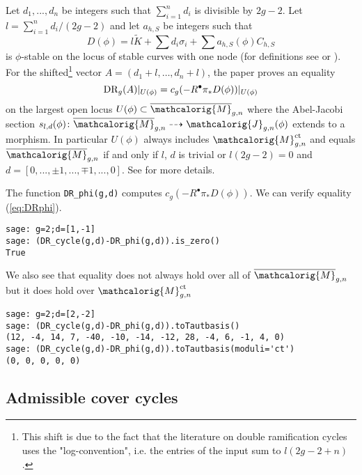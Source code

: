 \documentclass[11pt]{article}
\newcommand{\M}{\ensuremath{\overline{\mathcalorig{M}}}}
\begin{document}
Let $d_1,...,d_n$ be integers such that $\sum_{i=1}^n d_i$ is divisible by $2g-2$. Let $l=\sum_{i=1}^n d_i /(2g-2)$ and let $a_{h,S}$ be integers such that
\[
 D(\phi)=l\tilde{K} + \sum d_i \sigma_i + \sum a_{h,S}(\phi) C_{h,S}
\]
is $\phi$-stable on the locus of stable curves with one node (for definitions see \cite{KassPagani1} or \cite{PRvZ}). For the shifted\footnote{This shift is due to the fact that the literature on double ramification cycles uses the "log-convention", i.e. the entries of the input sum to $l(2g-2+n)$.} vector $A=(d_1+l, \ldots, d_n+l)$, the paper \cite{HKP} proves an equality
\begin{equation}\label{eq:DRphi}
\textup{DR}_g(A)|_{U(\phi)} = c_g(-R^\bullet \pi_* D(\phi))|_{U(\phi)}
\end{equation}
on the largest open locus $U(\phi)\subset \M_{g,n}$ where the Abel-Jacobi section $s_{l,d}(\phi)\colon  \M_{g,n}  \dashrightarrow \mathcalorig{J}_{g,n}(\phi)$
extends to a morphism. In particular $U(\phi)$ always includes $\mathcalorig{M}_{g,n}^{\text{ct}}$ and equals $\M_{g,n}$ if and only if $l$, $d$ is trivial or  $l(2g-2)=0$ and $d=[0,...,\pm 1,...,\mp 1, ...,0]$. See \cite[Section 4.3]{PRvZ} for more details.



The function \verb|DR_phi(g,d)| computes $c_g(-R^\bullet \pi_* D(\phi))$. We can verify equality (\ref{eq:DRphi}).
\begin{lstlisting}
sage: g=2;d=[1,-1]
sage: (DR_cycle(g,d)-DR_phi(g,d)).is_zero()
True
\end{lstlisting}
We also see that equality does not always hold over all of $\M_{g,n}$ but it does hold over $\mathcalorig{M}_{g,n}^\textup{ct}$
\begin{lstlisting}
sage: g=2;d=[2,-2]
sage: (DR_cycle(g,d)-DR_phi(g,d)).toTautbasis()
(12, -4, 14, 7, -40, -10, -14, -12, 28, -4, 6, -1, 4, 0)
sage: (DR_cycle(g,d)-DR_phi(g,d)).toTautbasis(moduli='ct')
(0, 0, 0, 0, 0)
\end{lstlisting}






\subsection{Admissible cover cycles} \label{Sect:admccycles}
\end{document}
